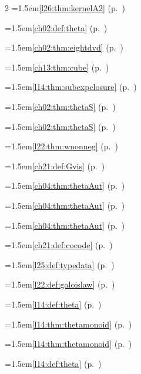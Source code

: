 \begin{multicols}{2}
\hangindent=1.5em\quad \ref{l26:thm:kernelA2} (p.~\pageref{l26:thm:kernelA2})\par
\hangindent=1.5em\quad \ref{ch02:def:theta} (p.~\pageref{ch02:def:theta})\par
\hangindent=1.5em\quad \ref{ch02:thm:eightdvd} (p.~\pageref{ch02:thm:eightdvd})\par
\hangindent=1.5em\quad \ref{ch13:thm:cube} (p.~\pageref{ch13:thm:cube})\par
\hangindent=1.5em\quad \ref{l14:thm:subexpclosure} (p.~\pageref{l14:thm:subexpclosure})\par
\hangindent=1.5em\quad \ref{ch02:thm:thetaS} (p.~\pageref{ch02:thm:thetaS})\par
\hangindent=1.5em\quad \ref{ch02:thm:thetaS} (p.~\pageref{ch02:thm:thetaS})\par
\hangindent=1.5em\quad \ref{l22:thm:wnonneg} (p.~\pageref{l22:thm:wnonneg})\par
\hangindent=1.5em\quad \ref{ch21:def:Gvis} (p.~\pageref{ch21:def:Gvis})\par
\hangindent=1.5em\quad \ref{ch04:thm:thetaAut} (p.~\pageref{ch04:thm:thetaAut})\par
\hangindent=1.5em\quad \ref{ch04:thm:thetaAut} (p.~\pageref{ch04:thm:thetaAut})\par
\hangindent=1.5em\quad \ref{ch04:thm:thetaAut} (p.~\pageref{ch04:thm:thetaAut})\par
\hangindent=1.5em\quad \ref{ch21:def:cocode} (p.~\pageref{ch21:def:cocode})\par
\hangindent=1.5em\quad \ref{l25:def:typedata} (p.~\pageref{l25:def:typedata})\par
\hangindent=1.5em\quad \ref{l22:def:galoislaw} (p.~\pageref{l22:def:galoislaw})\par
\hangindent=1.5em\quad \ref{l14:def:theta} (p.~\pageref{l14:def:theta})\par
\hangindent=1.5em\quad \ref{l14:thm:thetamonoid} (p.~\pageref{l14:thm:thetamonoid})\par
\hangindent=1.5em\quad \ref{l14:thm:thetamonoid} (p.~\pageref{l14:thm:thetamonoid})\par
\hangindent=1.5em\quad \ref{l14:def:theta} (p.~\pageref{l14:def:theta})\par

\end{multicols}
